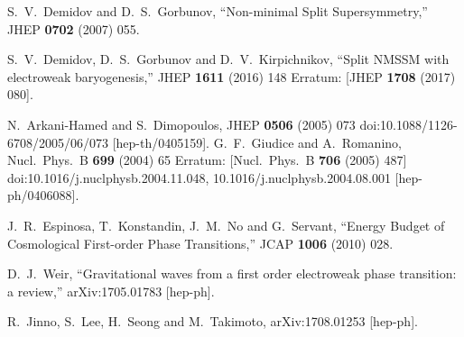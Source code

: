 \documentclass[12pt]{article}
\begin{document}
\begin{thebibliography}{99}
  S.~V.~Demidov and D.~S.~Gorbunov,
  ``Non-minimal Split Supersymmetry,''
  JHEP {\bf 0702} (2007) 055.

 S.~V.~Demidov, D.~S.~Gorbunov and D.~V.~Kirpichnikov,
 ``Split NMSSM with electroweak baryogenesis,''
 JHEP {\bf 1611} (2016) 148
 Erratum: [JHEP {\bf 1708} (2017) 080].

  N.~Arkani-Hamed and S.~Dimopoulos,
  JHEP {\bf 0506} (2005) 073
  doi:10.1088/1126-6708/2005/06/073
  [hep-th/0405159].
  G.~F.~Giudice and A.~Romanino,
  Nucl.\ Phys.\ B {\bf 699} (2004) 65
   Erratum: [Nucl.\ Phys.\ B {\bf 706} (2005) 487]
  doi:10.1016/j.nuclphysb.2004.11.048, 10.1016/j.nuclphysb.2004.08.001
  [hep-ph/0406088].


 
  J.~R.~Espinosa, T.~Konstandin, J.~M.~No and G.~Servant,
  ``Energy Budget of Cosmological First-order Phase Transitions,''
  JCAP {\bf 1006} (2010) 028.
  
  D.~J.~Weir,
  ``Gravitational waves from a first order electroweak phase transition: a review,''
  arXiv:1705.01783 [hep-ph].
  
  
  R.~Jinno, S.~Lee, H.~Seong and M.~Takimoto,
  arXiv:1708.01253 [hep-ph].
  

\end{thebibliography}
\end{document}
